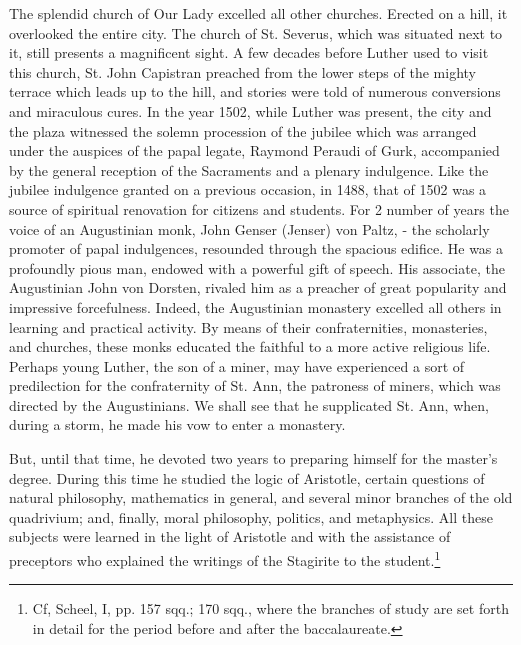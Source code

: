 The splendid church of Our Lady excelled all other churches.
Erected on a hill, it overlooked the entire city. The church of St.
Severus, which was situated next to it, still presents a magnificent
sight. A few decades before Luther used to visit this church, St. John
Capistran preached from the lower steps of the mighty terrace which
leads up to the hill, and stories were told of numerous conversions
and miraculous cures. In the year 1502, while Luther was present, the
city and the plaza witnessed the solemn procession of the jubilee
which was arranged under the auspices of the papal legate, Raymond
Peraudi of Gurk, accompanied by the general reception of the
Sacraments and a plenary indulgence. Like the jubilee indulgence
granted on a previous occasion, in 1488, that of 1502 was a source of
spiritual renovation for citizens and students. For 2 number of years
the voice of an Augustinian monk, John Genser (Jenser) von Paltz,
- the scholarly promoter of papal indulgences, resounded through the
spacious edifice. He was a profoundly pious man, endowed with
a powerful gift of speech. His associate, the Augustinian John von
Dorsten, rivaled him as a preacher of great popularity and impressive
forcefulness. Indeed, the Augustinian monastery excelled all others
in learning and practical activity. By means of their confraternities,
monasteries, and churches, these monks educated the faithful to a
more active religious life. Perhaps young Luther, the son of a miner,
may have experienced a sort of predilection for the confraternity of
St. Ann, the patroness of miners, which was directed by the Augustinians.
We shall see that he supplicated St. Ann, when, during a
storm, he made his vow to enter a monastery.

But, until that time, he devoted two years to preparing himself for
the master’s degree. During this time he studied the logic of Aristotle,
certain questions of natural philosophy, mathematics in general, and
several minor branches of the old quadrivium; and, finally, moral
philosophy, politics, and metaphysics. All these subjects were learned
in the light of Aristotle and with the assistance of preceptors who
explained the writings of the Stagirite to the student.\footnote{
Cf, Scheel, I, pp. 157 sqq.; 170 sqq., where the branches of study are set forth in
detail for the period before and after the baccalaureate.
}

